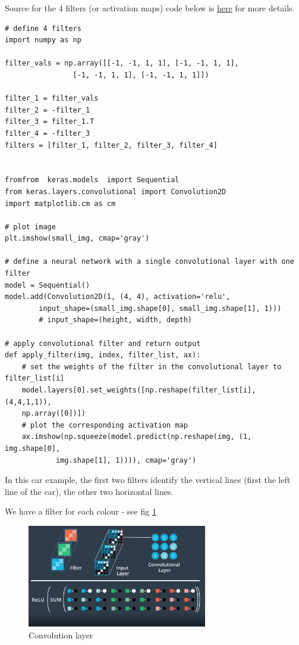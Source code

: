 \documentclass[11pt]{article}
\begin{document}
Source for the 4 filters (or activation maps) code below is \href{https://github.com/udacity/aind2-cnn/blob/master/conv-visualization/conv_visualization.ipynb}{here} for more details.
\begin{lstlisting}
# define 4 filters
import numpy as np

filter_vals = np.array([[-1, -1, 1, 1], [-1, -1, 1, 1], 
				[-1, -1, 1, 1], [-1, -1, 1, 1]])

filter_1 = filter_vals
filter_2 = -filter_1
filter_3 = filter_1.T
filter_4 = -filter_3
filters = [filter_1, filter_2, filter_3, filter_4]


fromfrom  keras.models  import Sequential
from keras.layers.convolutional import Convolution2D
import matplotlib.cm as cm

# plot image
plt.imshow(small_img, cmap='gray')

# define a neural network with a single convolutional layer with one filter
model = Sequential()
model.add(Convolution2D(1, (4, 4), activation='relu', 
		input_shape=(small_img.shape[0], small_img.shape[1], 1)))
		# input_shape=(height, width, depth)

# apply convolutional filter and return output
def apply_filter(img, index, filter_list, ax):
	# set the weights of the filter in the convolutional layer to filter_list[i]
	model.layers[0].set_weights([np.reshape(filter_list[i], (4,4,1,1)), 
	np.array([0])])
	# plot the corresponding activation map
	ax.imshow(np.squeeze(model.predict(np.reshape(img, (1, img.shape[0], 
			img.shape[1], 1)))), cmap='gray')
\end{lstlisting}
In this car example, the first two filters identify the vertical lines (first the left line of the car), the other two horizontal lines.

We have a filter for each colour -  see fig \ref{convolution_2}
\begin{figure}[htbp] 
	\centering
	\includegraphics[width=0.7\textwidth]{pics/convolution_2}
	\caption{Convolution layer} 
	\label{convolution_2}
\end{figure}
\end{document}
